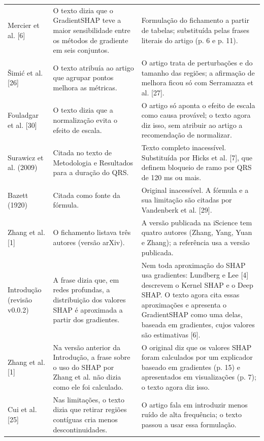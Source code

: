 \documentclass[11pt,a4paper]{article}
\begin{document}
\begin{longtable}{>{\raggedright\arraybackslash}p{3.0cm}>{\raggedright\arraybackslash}p{6.2cm}>{\raggedright\arraybackslash}p{7.2cm}}
\addlinespace
Mercier et al. [6] & O texto dizia que o GradientSHAP teve a maior sensibilidade entre os métodos de gradiente em seis conjuntos. & Formulação do fichamento a partir de tabelas; substituída pelas frases literais do artigo (p. 6 e p. 11). \\
\addlinespace
Šimić et al. [26] & O texto atribuía ao artigo que agrupar pontos melhora as métricas. & O artigo trata de perturbações e do tamanho das regiões; a afirmação de melhora ficou só com Serramazza et al. [27]. \\
\addlinespace
Fouladgar et al. [30] & O texto dizia que a normalização evita o efeito de escala. & O artigo só aponta o efeito de escala como causa provável; o texto agora diz isso, sem atribuir ao artigo a recomendação de normalizar. \\
\addlinespace
Surawicz et al. (2009) & Citada no texto de Metodologia e Resultados para a duração do QRS. & Texto completo inacessível. Substituída por Hicks et al. [7], que definem bloqueio de ramo por QRS de 120 ms ou mais. \\
\addlinespace
Bazett (1920) & Citada como fonte da fórmula. & Original inacessível. A fórmula e a sua limitação são citadas por Vandenberk et al. [29]. \\
\addlinespace
Zhang et al. [1] & O fichamento listava três autores (versão arXiv). & A versão publicada na iScience tem quatro autores (Zhang, Yang, Yuan e Zhang); a referência usa a versão publicada. \\
\addlinespace
Introdução (revisão v0.0.2) & A frase dizia que, em redes profundas, a distribuição dos valores SHAP é aproximada a partir dos gradientes. & Nem toda aproximação do SHAP usa gradientes: Lundberg e Lee [4] descrevem o Kernel SHAP e o Deep SHAP. O texto agora cita essas aproximações e apresenta o GradientSHAP como uma delas, baseada em gradientes, cujos valores são estimativas [6]. \\
\addlinespace
Zhang et al. [1] & Na versão anterior da Introdução, a frase sobre o uso do SHAP por Zhang et al. não dizia como ele foi calculado. & O original diz que os valores SHAP foram calculados por um explicador baseado em gradientes (p. 15) e apresentados em visualizações (p. 7); o texto agora diz isso. \\
\addlinespace
Cui et al. [25] & Nas limitações, o texto dizia que retirar regiões contíguas cria menos descontinuidades. & O artigo fala em introduzir menos ruído de alta frequência; o texto passou a usar essa formulação. \\

\end{longtable}
\end{document}
